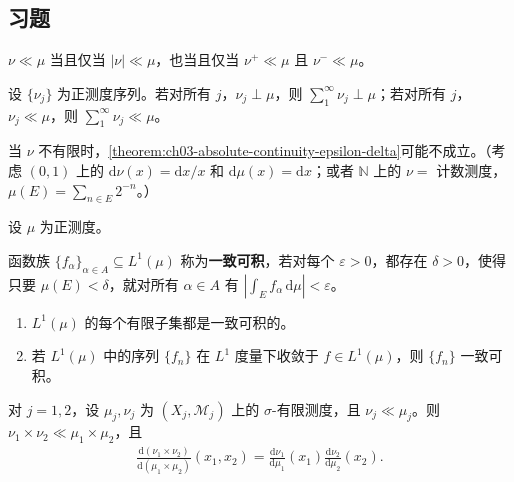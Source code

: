\documentclass[../../main.tex]{subfiles}%
\begin{document}
\subsection*{习题}
\begin{exercise}\label{exercise:ch03-absolute-continuity-variations}
$\nu\ll\mu$ 当且仅当 $|\nu|\ll\mu$，也当且仅当 $\nu^+\ll\mu$ 且 $\nu^-\ll\mu$。
\end{exercise}
\begin{exercise}\label{exercise:ch03-countable-singular-absolute}
设 $\{\nu_j\}$ 为正测度序列。若对所有 $j$，$\nu_j\perp\mu$，则 $\sum_1^\infty\nu_j\perp\mu$；若对所有 $j$，$\nu_j\ll\mu$，则 $\sum_1^\infty\nu_j\ll\mu$。
\end{exercise}
\begin{exercise}\label{exercise:ch03-nonfinite-absolute-continuity}
当 $\nu$ 不有限时，\cref{theorem:ch03-absolute-continuity-epsilon-delta}可能不成立。（考虑 $(0,1)$ 上的 $\mathrm{d}\nu(x)=\mathrm{d}x/x$ 和 $\mathrm{d}\mu(x)=\mathrm{d}x$；或者 $\mathbb{N}$ 上的 $\nu=$ 计数测度，$\mu(E)=\sum_{n\in E}2^{-n}$。）
\end{exercise}
\begin{exercise}\label{exercise:ch03-uniform-integrability}
设 $\mu$ 为正测度。
\begin{definition*}[一致可积]
函数族 $\{f_\alpha\}_{\alpha\in A}\subseteq L^1(\mu)$ 称为\textbf{一致可积}，若对每个 $\varepsilon>0$，都存在 $\delta>0$，使得只要 $\mu(E)<\delta$，就对所有 $\alpha\in A$ 有 $|\int_E f_\alpha\,\mathrm{d}\mu|<\varepsilon$。
\end{definition*}
\begin{enumerate}
\item $L^1(\mu)$ 的每个有限子集都是一致可积的。
\item 若 $L^1(\mu)$ 中的序列 $\{f_n\}$ 在 $L^1$ 度量下收敛于 $f\in L^1(\mu)$，则 $\{f_n\}$ 一致可积。
\end{enumerate}
\end{exercise}
\begin{exercise}\label{exercise:ch03-radon-nikodym-product}
对 $j=1,2$，设 $\mu_j,\nu_j$ 为 $(X_j,\mathscr{M}_j)$ 上的 $\sigma$-有限测度，且 $\nu_j\ll\mu_j$。则 $\nu_1\times\nu_2\ll\mu_1\times\mu_2$，且
\begin{align*}
\frac{\mathrm{d}(\nu_1\times\nu_2)}{\mathrm{d}(\mu_1\times\mu_2)}(x_1,x_2)
=\frac{\mathrm{d}\nu_1}{\mathrm{d}\mu_1}(x_1)\frac{\mathrm{d}\nu_2}{\mathrm{d}\mu_2}(x_2).
\end{align*}
\end{exercise}
\end{document}
